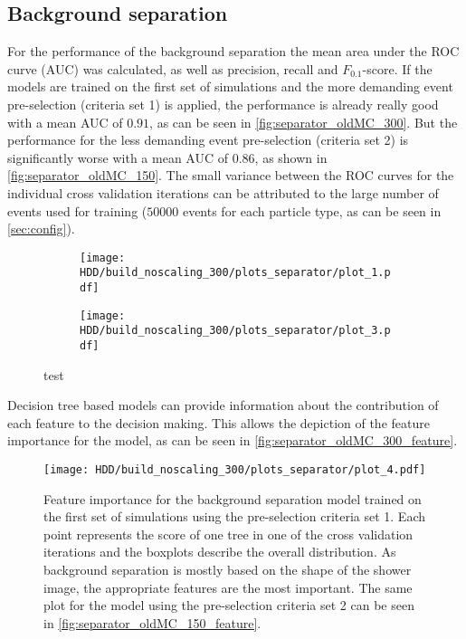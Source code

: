 \subsection{Background separation}
For the performance of the background separation the mean area under the ROC curve (AUC) was calculated, as well as precision, recall and $F_{0.1}$-score.
If the models are trained on the first set of simulations and the more demanding event pre-selection (criteria set 1) is applied,
the performance is already really good with a mean AUC of $\num{0.91}$, as can be seen in \autoref{fig:separator_oldMC_300}.
But the performance for the less demanding event pre-selection (criteria set 2) is significantly worse with a mean AUC of $\num{0.86}$, as shown in
\autoref{fig:separator_oldMC_150}. The small variance between the ROC curves for the individual cross validation iterations can be attributed to the large number 
of events used for training ($\num{50000}$ events for each particle type, as can be seen in \autoref{sec:config}). 
\begin{figure}
    \centering
    \begin{subfigure}{0.7\textwidth}
        \centering
        \texttt{[image: HDD/build\_noscaling\_300/plots\_separator/plot\_1.pdf]}
        \label{fig:separator_oldMC_300_1}
    \end{subfigure}
    \hfill
    \begin{subfigure}{0.7\textwidth}
        \centering
        \texttt{[image: HDD/build\_noscaling\_300/plots\_separator/plot\_3.pdf]}
        \label{fig:separator_oldMC_300_2}
    \end{subfigure}
    \caption{test}
    \label{fig:separator_oldMC_300}
\end{figure}

Decision tree based models can provide information about the contribution of each feature to the decision making.
This allows the depiction of the feature importance for the model, as can be seen in \autoref{fig:separator_oldMC_300_feature}.
\begin{figure}
    \centering
    \texttt{[image: HDD/build\_noscaling\_300/plots\_separator/plot\_4.pdf]}
    \caption{Feature importance for the background separation model trained on the first set of simulations using the pre-selection criteria set 1.
        Each point represents the score of one tree in one of the cross validation iterations and the boxplots describe the overall distribution.
        As background separation is mostly based on the shape of the shower image, the appropriate features are the most important.
        The same plot for the model using the pre-selection criteria set 2 can be seen in \autoref{fig:separator_oldMC_150_feature}.
    }
    \label{fig:separator_oldMC_300_feature}
\end{figure}

